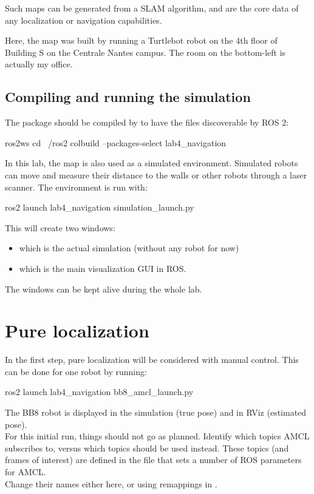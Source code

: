 \documentclass{ecnreport}
\begin{document}
Such maps can be generated from a SLAM algorithm, and are the core data of any localization or navigation capabilities.

Here, the map was built by running a Turtlebot robot on the 4th floor of Building S on the Centrale Nantes campus. The room on the bottom-left is actually my office.


\subsection{Compiling and running the simulation}

The package should be compiled by  to have the files discoverable by ROS 2:
\begin{bashcodelarge}
 ros2ws
 cd ~/ros2
 colbuild --packages-select lab4_navigation
\end{bashcodelarge}

In this lab, the map is also used as a simulated environment. Simulated robots can move and measure their distance to the walls or other robots through a laser scanner. The environment is run with:
\begin{bashcodelarge}
 ros2 launch lab4_navigation simulation_launch.py 
\end{bashcodelarge}This will create two windows:
\begin{itemize}
 \item {} which is the actual simulation (without any robot for now)
 \item {} which is the main visualization GUI in ROS.
\end{itemize}
The windows can be kept alive during the whole lab.

\newpage

\section{Pure localization}

In the first step, pure localization will be considered with manual control. This can be done for one robot by running:
\begin{bashcodelarge}
 ros2 launch lab4_navigation bb8_amcl_launch.py
\end{bashcodelarge}
The BB8 robot is displayed in the simulation (true pose) and in RViz (estimated pose).\\

For this initial run, things should not go as planned. Identify which topics AMCL subscribes to, versus which topics should be used instead. These topics (and frames of interest) are defined in the file  that sets a number of ROS parameters for AMCL. \\Change their names either here, or using remappings in . 
\end{document}

